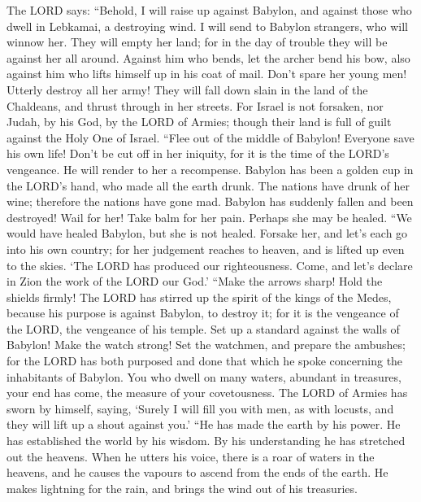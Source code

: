  The LORD says: ``Behold, I will raise up against Babylon,
and against those who dwell in Lebkamai, a destroying wind. 
I will send to Babylon strangers, who will winnow her. They will empty
her land; for in the day of trouble they will be against her all around.
 Against him who bends, let the archer bend his bow, also
against him who lifts himself up in his coat of mail. Don't spare her
young men! Utterly destroy all her army!  They will fall
down slain in the land of the Chaldeans, and thrust through in her
streets.  For Israel is not forsaken, nor Judah, by his God,
by the LORD of Armies; though their land is full of guilt against the
Holy One of Israel.  ``Flee out of the middle of Babylon!
Everyone save his own life! Don't be cut off in her iniquity, for it is
the time of the LORD's vengeance. He will render to her a recompense.
 Babylon has been a golden cup in the LORD's hand, who made
all the earth drunk. The nations have drunk of her wine; therefore the
nations have gone mad.  Babylon has suddenly fallen and been
destroyed! Wail for her! Take balm for her pain. Perhaps she may be
healed.  ``We would have healed Babylon, but she is not
healed. Forsake her, and let's each go into his own country; for her
judgement reaches to heaven, and is lifted up even to the skies.
 `The LORD has produced our righteousness. Come, and let's
declare in Zion the work of the LORD our God.'  ``Make the
arrows sharp! Hold the shields firmly! The LORD has stirred up the
spirit of the kings of the Medes, because his purpose is against
Babylon, to destroy it; for it is the vengeance of the LORD, the
vengeance of his temple.  Set up a standard against the
walls of Babylon! Make the watch strong! Set the watchmen, and prepare
the ambushes; for the LORD has both purposed and done that which he
spoke concerning the inhabitants of Babylon.  You who dwell
on many waters, abundant in treasures, your end has come, the measure of
your covetousness.  The LORD of Armies has sworn by
himself, saying, `Surely I will fill you with men, as with locusts, and
they will lift up a shout against you.'  ``He has made the
earth by his power. He has established the world by his wisdom. By his
understanding he has stretched out the heavens.  When he
utters his voice, there is a roar of waters in the heavens, and he
causes the vapours to ascend from the ends of the earth. He makes
lightning for the rain, and brings the wind out of his treasuries.

